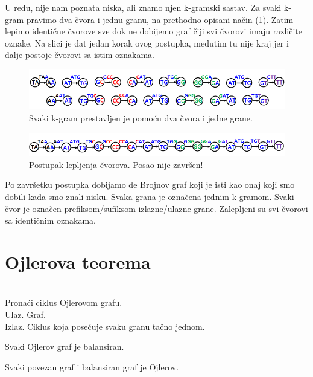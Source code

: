 U redu, nije nam poznata niska, ali znamo njen k-gramski sastav. Za svaki k-gram pravimo dva čvora i jednu granu, na prethodno opisani način (\ref{slika:kgrami}).
Zatim lepimo identične čvorove sve dok ne dobijemo graf čiji svi čvorovi imaju različite oznake. Na slici je dat jedan korak ovog postupka, međutim tu nije kraj jer i dalje postoje čvorovi sa istim oznakama.

\begin{figure}[h]
	\centering
	\includegraphics[width=1\textwidth]{poglavlja/3/slike/debrojnov1.png}
	\caption{Svaki k-gram prestavljen je pomoću dva čvora i jedne grane.}
	\label{slika:kgrami}
\end{figure} 

\begin{figure}[h]
	\centering
	\includegraphics[width=1\textwidth]{poglavlja/3/slike/lepljenje.png}
	\caption{Postupak lepljenja čvorova. Posao nije završen!}
	\label{slika:lepljenje}
\end{figure} 

Po završetku postupka dobijamo de Brojnov graf koji je isti kao onaj koji smo dobili kada smo znali nisku. Svaka grana je označena jednim k-gramom. Svaki čvor je označen prefiksom/sufiksom izlazne/ulazne grane. Zalepljeni su svi čvorovi sa identičnim oznakama.

\section{Ojlerova teorema}

\begin{problem}
	~\\ Pronaći ciklus Ojlerovom grafu.
	\\ Ulaz. Graf.
	\\ Izlaz. Ciklus koja posećuje svaku granu tačno jednom.
\end{problem}

Svaki Ojlerov graf je balansiran.

\begin{teorema}
	Svaki povezan graf i balansiran graf je Ojlerov.
\end{teorema}

